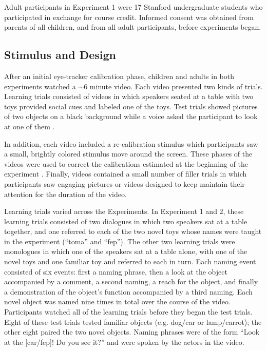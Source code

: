 \documentclass{pnastwo}
\begin{document}
\begin{article}
\begin{materials}
Adult participants in Experiment 1 were 17 Stanford undergraduate students who participated in exchange for course credit. Informed consent was obtained from parents of all children, and from all adult participants, before experiments began.

\subsection{Stimulus and Design} After an initial eye-tracker calibration phase, children and adults in both experiments watched a $\sim$6 minute video. Each video presented two kinds of trials. Learning trials consisted of videos in which speakers seated at a table with two toys provided social cues and labeled one of the toys. Test trials showed pictures of two objects on a black background while a voice asked the participant to look at one of them \citep[as in][]{fernald1998}.

In addition, each video included a re-calibration stimulus which participants saw a small, brightly colored stimulus move around the screen. These phases of the videos were used to correct the calibrations estimated at the beginning of the experiment \citep[see][]{frank2012}. Finally, videos contained a small number of filler trials in which participants saw engaging pictures or videos designed to keep maintain their attention for the duration of the video.

Learning trials varied across the Experiments. In Experiment 1 and 2, these learning trials consisted of two dialogues in which two speakers sat at a table together, and one referred to each of the two novel toys whose names were taught in the experiment (``toma'' and ``fep''). The other two learning trials were monologues in which one of the speakers sat at a table alone, with one of the novel toys and one familiar toy and referred to each in turn. Each naming event consisted of six events: first a naming phrase, then a look at the object accompanied by a comment, a second naming, a reach for the object, and finally a demonstration of the object's function accompanied by a third naming. Each novel object was named nine times in total over the course of the video. Participants watched all of the learning trials before they began the test trials. Eight of these test trials tested familiar objects (e.g. dog/car or lamp/carrot); the other eight paired the two novel objects. Naming phrases were of the form ``Look at the [car/fep]! Do you see it?'' and were spoken by the actors in the video.


\end{materials}
\end{article}
\end{document}
